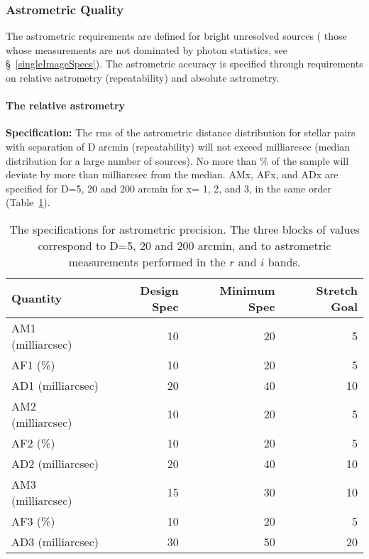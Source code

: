 \subsubsection{Astrometric Quality}

The astrometric requirements are defined for bright unresolved sources (\ie
those whose measurements are not dominated by photon statistics, see
\S~\ref{singleImageSpecs}). The astrometric accuracy is specified through
requirements on relative astrometry (repeatability) and absolute
astrometry.


\paragraph{The relative astrometry\\}

{\bf Specification:} The rms of the astrometric distance distribution for
stellar pairs with separation of D arcmin (repeatability) will not exceed
milliarcsec (median distribution for a large number of
sources). No more than
\% of the sample will deviate by more than
milliarcsec from the median. AMx, AFx,
and ADx are specified for D=5, 20 and 200 arcmin for x= 1, 2, and 3, in the
same order (Table~\ref{TastroRel}).

\begin{table}[h]
\begin{tabular}{|l|r|r|r|}
\hline
Quantity   & Design Spec & Minimum Spec & Stretch Goal     \\
\hline
    AM1 (milliarcsec)  &    10      &        20    &        5         \\
    AF1 (\%)          &    10      &        20    &        5         \\
    AD1 (milliarcsec)  &    20      &        40   &        10         \\
\hline
    AM2 (milliarcsec)  &    10      &        20    &        5         \\
    AF2 (\%)          &    10      &        20    &        5         \\
    AD2 (milliarcsec)  &    20      &        40   &        10         \\
\hline
    AM3 (milliarcsec)  &    15      &        30    &       10         \\
    AF3 (\%)          &    10      &        20    &        5         \\
    AD3 (milliarcsec)  &    30      &        50   &        20         \\
\hline
\end{tabular}
\caption{The specifications for astrometric precision. The three blocks
of values correspond to D=5, 20 and 200 arcmin, and
to astrometric measurements performed in the $r$ and $i$ bands.}
\label{TastroRel}
\end{table}

